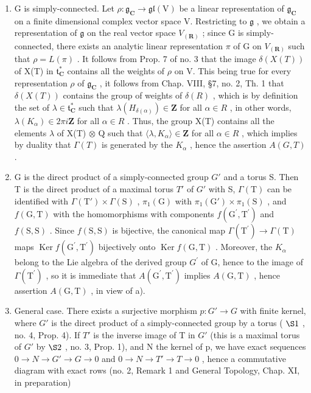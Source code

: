 \begin{enumerate}
\def\labelenumi{\alph{enumi})}
\item
  G is simply-connected. Let \(\rho : \mathfrak{g}_{\mathbf{C}} \to \mathfrak{gl}(\mathrm{V})\) be a linear representation of \(\mathfrak{g}_{\mathbf{C}}\) on a finite dimensional complex vector space V. Restricting to \(\mathfrak{g}\) , we obtain a representation of \(\mathfrak{g}\) on the real vector space \(V_{(\mathbf{R})}\) ; since G is simply-connected, there exists an analytic linear representation \(\pi\) of G on \(V_{(\mathbf{R})}\) such that \(\rho = L(\pi)\) . It follows from Prop. 7 of no. 3 that the image \(\delta(X(T))\) of X(T) in \(\mathfrak{t}_{\mathbf{C}}^{*}\) contains all the weights of \(\rho\) on V. This being true for every representation \(\rho\) of \(\mathfrak{g}_{\mathbf{C}}\) , it follows from Chap. VIII, §7, no. 2, Th. 1 that \(\delta(X(T))\) contains the group of weights of \(\delta(R)\) , which is by definition the set of \(\lambda \in \mathfrak{t}_{\mathbf{C}}^{*}\) such that \(\lambda(H_{\delta(\alpha)}) \in \mathbf{Z}\) for all \(\alpha \in R\) , in other words, \(\lambda(K_{\alpha}) \in 2\pi i\mathbf{Z}\) for all \(\alpha \in R\) . Thus, the group X(T) contains all the elements \(\lambda\) of X(T) \(\otimes\) Q such that \(\langle\lambda, K_{\alpha} \rangle \in \mathbf{Z}\) for all \(\alpha \in R\) , which implies by duality that \(\Gamma(T)\) is generated by the \(K_{\alpha}\) , hence the assertion \(A(G,T)\) .
\item
  G is the direct product of a simply-connected group \(G'\) and a torus S. Then T is the direct product of a maximal torus \(T'\) of \(G'\) with S, \(\varGamma(\mathrm{T})\) can be identified with \(\varGamma(\mathrm{T}')\times\varGamma(\mathrm{S})\) , \(\pi_{1}(\mathrm{G})\) with \(\pi_{1}(\mathrm{G}')\times\pi_{1}(\mathrm{S})\) , and \(f(\mathrm{G},\mathrm{T})\) with the homomorphisms with components \(f(\mathrm{G}^{\prime},\mathrm{T}^{\prime})\) and \(f(\mathrm{S},\mathrm{S})\) . Since \(f(\mathrm{S},\mathrm{S})\) is bijective, the canonical map \(\varGamma(\mathrm{T}^{\prime})\to\varGamma(\mathrm{T})\) maps \(\operatorname{Ker}f(\mathrm{G}^{\prime},\mathrm{T}^{\prime})\) bijectively onto \(\operatorname{Ker}f(\mathrm{G},\mathrm{T})\) . Moreover, the \(K_{\alpha}\) belong to the Lie algebra of the derived group \(G^{\prime}\) of G, hence to the image of \(\varGamma(\mathrm{T}^{\prime})\) , so it is immediate that \(A(\mathrm{G}^{\prime},\mathrm{T}^{\prime})\) implies \(A(\mathrm{G},\mathrm{T})\) , hence assertion \(A(\mathrm{G},\mathrm{T})\) , in view of a).
\item
  General case. There exists a surjective morphism \(p : G' \to G\) with finite kernel, where \(G'\) is the direct product of a simply-connected group by a torus ( \(\S1\) , no. 4, Prop. 4). If \(T'\) is the inverse image of T in \(G'\) (this is a maximal torus of \(G'\) by \(\S2\) , no. 3, Prop. 1), and N the kernel of p, we have exact sequences \(0 \to N \to G' \to G \to 0\) and \(0 \to N \to T' \to T \to 0\) , hence a commutative diagram with exact rows (no. 2, Remark 1 and General Topology, Chap. XI, in preparation)
\end{enumerate}

